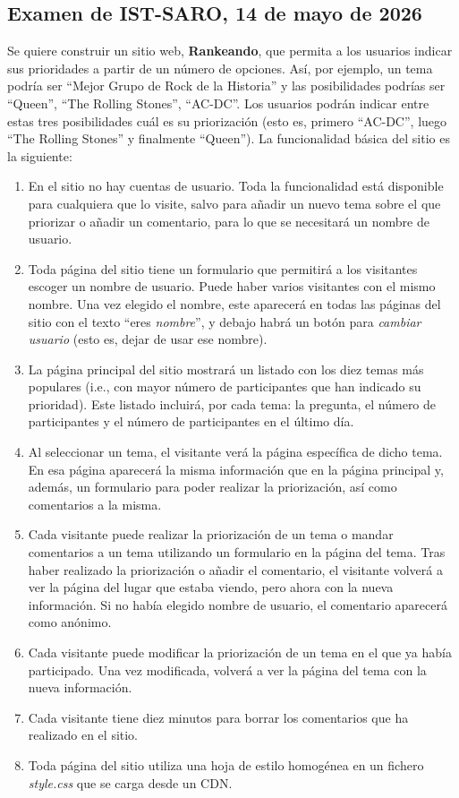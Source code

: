 \subsection{Examen de IST-SARO, 14 de mayo de 2026}

Se quiere construir un sitio web, {\bf Rankeando}, que permita a los usuarios indicar sus prioridades a partir de un número de opciones. Así, por ejemplo, un tema podría ser ``Mejor Grupo de Rock de la Historia'' y las posibilidades podrías ser ``Queen'', ``The Rolling Stones'', ``AC-DC''. Los usuarios podrán indicar entre estas tres posibilidades cuál es su priorización (esto es, primero ``AC-DC'', luego ``The Rolling Stones'' y finalmente ``Queen''). La funcionalidad básica del sitio es la siguiente:

\begin{enumerate}
    \item En el sitio no hay cuentas de usuario. Toda la funcionalidad está disponible para cualquiera que lo visite, salvo para añadir un nuevo tema sobre el que priorizar o añadir un comentario, para lo que se necesitará un nombre de usuario.
    \item Toda página del sitio tiene un formulario que permitirá a los visitantes escoger un nombre de usuario. Puede haber varios visitantes con el mismo nombre. Una vez elegido el nombre, este aparecerá en todas las páginas del sitio con el texto ``eres \emph{nombre}'', y debajo habrá un botón para \emph{cambiar usuario} (esto es, dejar de usar ese nombre).
    \item La página principal del sitio mostrará un listado con los diez temas más populares (i.e., con mayor número de participantes que han indicado su prioridad). Este listado incluirá, por cada tema: la pregunta, el número de participantes y el número de participantes en el último día.
    \item Al seleccionar un tema, el visitante verá la página específica de dicho tema. En esa página aparecerá la misma información que en la página principal y, además, un formulario para poder realizar la priorización, así como comentarios a la misma.
    \item Cada visitante puede realizar la priorización de un tema o mandar comentarios a un tema utilizando un formulario en la página del tema. Tras haber realizado la priorización o añadir el comentario, el visitante volverá a ver la página del lugar que estaba viendo, pero ahora con la nueva información. Si no había elegido nombre de usuario, el comentario aparecerá como anónimo.
    \item Cada visitante puede modificar la priorización de un tema en el que ya había participado. Una vez modificada, volverá a ver la página del tema con la nueva información.
    \item Cada visitante tiene diez minutos para borrar los comentarios que ha realizado en el sitio.
    \item Toda página del sitio utiliza una hoja de estilo homogénea en un fichero \emph{style.css} que se carga desde un CDN.
\end{enumerate}

